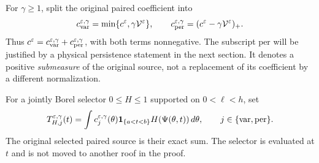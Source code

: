 For $\gamma\ge1$, split the original paired coefficient into
\begin{equation}\label{eq:v110-positive-split}
 c_{\rm var}^{\varepsilon,\gamma}
       =\min\{c^\varepsilon,\gamma\mathcal V^\varepsilon\},\qquad
 c_{\rm per}^{\varepsilon,\gamma}
       =(c^\varepsilon-\gamma\mathcal V^\varepsilon)_+.
\end{equation}
Thus $c^\varepsilon=c_{\rm var}^{\varepsilon,\gamma}
+c_{\rm per}^{\varepsilon,\gamma}$, with both terms nonnegative.
The subscript $\mathrm{per}$ will be justified by a physical
persistence statement in the next section. It denotes a positive
\emph{submeasure} of the original source, not a replacement of its
coefficient by a different normalization.

For a jointly Borel selector $0\le H\le1$ supported on $0<\ell<h$,
set
\begin{equation}\label{eq:v110-selected-sources}
 T_{H,j}^{\varepsilon,\gamma}(t)
   =\int c_j^{\varepsilon,\gamma}(\theta)
       \mathbf1_{\{a<t<b\}}H(\Psi(\theta,t))\,d\theta,
       \qquad j\in\{\mathrm{var},\mathrm{per}\}.
\end{equation}
The original selected paired source is their exact sum. The selector
is evaluated at $t$ and is not moved to another roof in the proof.

